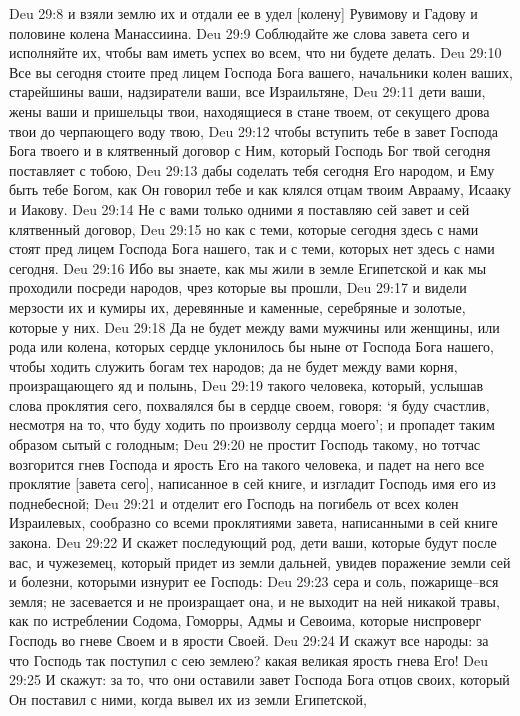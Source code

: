 Deu 29:8  и взяли землю их и отдали ее в удел [колену] Рувимову и Гадову и половине колена Манассиина.
Deu 29:9  Соблюдайте же слова завета сего и исполняйте их, чтобы вам иметь успех во всем, что ни будете делать.
Deu 29:10  Все вы сегодня стоите пред лицем Господа Бога вашего, начальники колен ваших, старейшины ваши, надзиратели ваши, все Израильтяне,
Deu 29:11  дети ваши, жены ваши и пришельцы твои, находящиеся в стане твоем, от секущего дрова твои до черпающего воду твою,
Deu 29:12  чтобы вступить тебе в завет Господа Бога твоего и в клятвенный договор с Ним, который Господь Бог твой сегодня поставляет с тобою,
Deu 29:13  дабы соделать тебя сегодня Его народом, и Ему быть тебе Богом, как Он говорил тебе и как клялся отцам твоим Аврааму, Исааку и Иакову.
Deu 29:14  Не с вами только одними я поставляю сей завет и сей клятвенный договор,
Deu 29:15  но как с теми, которые сегодня здесь с нами стоят пред лицем Господа Бога нашего, так и с теми, которых нет здесь с нами сегодня.
Deu 29:16  Ибо вы знаете, как мы жили в земле Египетской и как мы проходили посреди народов, чрез которые вы прошли,
Deu 29:17  и видели мерзости их и кумиры их, деревянные и каменные, серебряные и золотые, которые у них.
Deu 29:18  Да не будет между вами мужчины или женщины, или рода или колена, которых сердце уклонилось бы ныне от Господа Бога нашего, чтобы ходить служить богам тех народов; да не будет между вами корня, произращающего яд и полынь,
Deu 29:19  такого человека, который, услышав слова проклятия сего, похвалялся бы в сердце своем, говоря: `я буду счастлив, несмотря на то, что буду ходить по произволу сердца моего'; и пропадет таким образом сытый с голодным;
Deu 29:20  не простит Господь такому, но тотчас возгорится гнев Господа и ярость Его на такого человека, и падет на него все проклятие [завета сего], написанное в сей книге, и изгладит Господь имя его из поднебесной;
Deu 29:21  и отделит его Господь на погибель от всех колен Израилевых, сообразно со всеми проклятиями завета, написанными в сей книге закона.
Deu 29:22  И скажет последующий род, дети ваши, которые будут после вас, и чужеземец, который придет из земли дальней, увидев поражение земли сей и болезни, которыми изнурит ее Господь:
Deu 29:23  сера и соль, пожарище--вся земля; не засевается и не произращает она, и не выходит на ней никакой травы, как по истреблении Содома, Гоморры, Адмы и Севоима, которые ниспроверг Господь во гневе Своем и в ярости Своей.
Deu 29:24  И скажут все народы: за что Господь так поступил с сею землею? какая великая ярость гнева Его!
Deu 29:25  И скажут: за то, что они оставили завет Господа Бога отцов своих, который Он поставил с ними, когда вывел их из земли Египетской,
